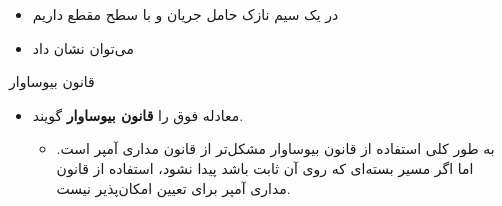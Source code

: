 \begin{ELunit}


\begin{itemize}
\tightlist
\item
  در یک سیم نازک حامل جریان  و با سطح مقطع  داریم
\end{itemize}


\begin{itemize}
\tightlist
\item
  می‌توان نشان داد
\end{itemize}


\end{ELunit}

\begin{ELimportant}{قانون بیوساوار}


\end{ELimportant}

\begin{ELunit}

\begin{itemize}
\tightlist
\item
  معادله فوق را \textbf{قانون بیوساوار} گویند.

  \begin{itemize}
  \tightlist
  \item
    به طور کلی استفاده از قانون بیوساوار مشکل‌تر از قانون مداری آمپر است. اما اگر مسیر بسته‌ای که  روی آن ثابت باشد پیدا نشود، استفاده از قانون مداری آمپر برای تعیین  امکان‌پذیر نیست.
  \end{itemize}
\end{itemize}

\end{ELunit}


